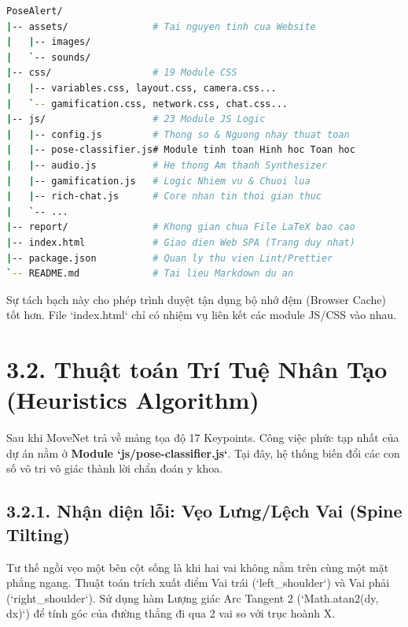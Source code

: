\documentclass[12pt,a4paper]{report}
\begin{document}
\begin{lstlisting}[language=bash]
PoseAlert/
|-- assets/               # Tai nguyen tinh cua Website
|   |-- images/
|   `-- sounds/
|-- css/                  # 19 Module CSS
|   |-- variables.css, layout.css, camera.css...
|   `-- gamification.css, network.css, chat.css...
|-- js/                   # 23 Module JS Logic
|   |-- config.js         # Thong so & Nguong nhay thuat toan
|   |-- pose-classifier.js# Module tinh toan Hinh hoc Toan hoc
|   |-- audio.js          # He thong Am thanh Synthesizer
|   |-- gamification.js   # Logic Nhiem vu & Chuoi lua
|   |-- rich-chat.js      # Core nhan tin thoi gian thuc
|   `-- ...
|-- report/               # Khong gian chua File LaTeX bao cao
|-- index.html            # Giao dien Web SPA (Trang duy nhat)
|-- package.json          # Quan ly thu vien Lint/Prettier
`-- README.md             # Tai lieu Markdown du an
\end{lstlisting}

Sự tách bạch này cho phép trình duyệt tận dụng bộ nhớ đệm (Browser Cache) tốt hơn. File `index.html` chỉ có nhiệm vụ liên kết các module JS/CSS vào nhau.

\section{3.2. Thuật toán Trí Tuệ Nhân Tạo (Heuristics Algorithm)}
Sau khi MoveNet trả về mảng tọa độ 17 Keypoints. Công việc phức tạp nhất của dự án nằm ở \textbf{Module `js/pose-classifier.js`}. Tại đây, hệ thống biến đổi các con số vô tri vô giác thành lời chẩn đoán y khoa.

\subsection{3.2.1. Nhận diện lỗi: Vẹo Lưng/Lệch Vai (Spine Tilting)}
Tư thế ngồi vẹo một bên cột sống là khi hai vai không nằm trên cùng một mặt phẳng ngang. Thuật toán trích xuất điểm Vai trái (`left_shoulder`) và Vai phải (`right_shoulder`).
Sử dụng hàm Lượng giác Arc Tangent 2 (`Math.atan2(dy, dx)`) để tính góc của đường thẳng đi qua 2 vai so với trục hoành X.
\end{document}
